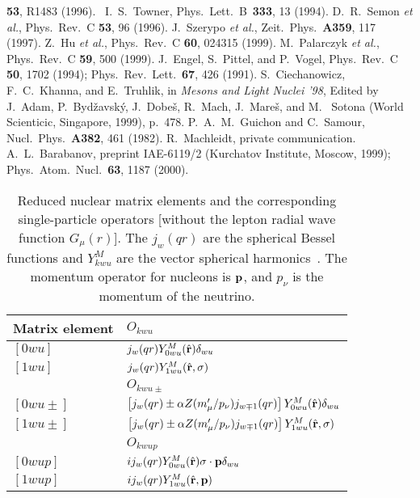 \begin{thebibliography}{00}
  {\bf 53}, R1483 (1996).~
 I.~S.~Towner, Phys.~Lett.~B~{\bf 333}, 13 (1994).
 D.~R.~Semon {\em et al.}, Phys.~Rev.~C {\bf 53}, 96 (1996).
 J.~Szerypo {\em et al.}, Zeit.~Phys.~{\bf A359}, 117 (1997).
 Z.~Hu {\em et al.}, Phys.~Rev.~C {\bf 60}, 024315 (1999).
 M.~Palarczyk {\em et al.}, Phys.~Rev.~C {\bf 59}, 500 (1999).
J.~Engel, S.~Pittel, and P.~Vogel, 
                 Phys.~Rev.~C {\bf 50}, 1702 (1994); Phys.~Rev.~Lett.~{\bf 67}, 426 (1991).
 S.~Ciechanowicz, F.~C.~Khanna, and E.~Truhlik, in
  {\em Mesons and Light Nuclei '98}, Edited by J.~Adam,
  P.~Byd\v{z}avsk\'{y}, J.~Dobe\v{s}, R.~Mach, J.~Mare\v{s}, and M.~
  Sotona (World Scienticic, Singapore, 1999), p.~478.
 P.~A.~M.~Guichon and C.~Samour, Nucl.~Phys.~{\bf A382}, 
  461 (1982).
 R.~Machleidt, private communication.
 A.~L.~Barabanov, preprint IAE-6119/2 (Kurchatov
  Institute, Moscow, 1999); Phys.~Atom.~Nucl.~{\bf 63}, 1187 (2000).


\end{thebibliography}
\clearpage
\begin{table}
\caption{Reduced nuclear matrix elements and the
corresponding single-particle operators [without the lepton radial
wave function $G_\mu(r)$]. The 
$j_w(qr)$ are the spherical Bessel functions and $Y_{kwu}^M$ are the 
vector spherical harmonics~\protect\cite{mor60}. The momentum
operator for nucleons is $\bf p$, and $p_\nu$ is the momentum
of the neutrino.}
\begin{tabular}{ll}
        Matrix element & $O_{kwu}$ \\
        \hline
        \vspace{2pt}
        $[0wu]$ & $j_w(qr)Y_{0wu}^M(\hat {\bf r})\delta_{wu}$ \\
        $[1wu]$ & $j_w(qr)Y_{1wu}^M(\hat {\bf r},{\mathbf\sigma})$ \\
        \hline
        & $O_{kwu\pm}$ \\
        \hline
        $[0wu\pm]$ & $\left[j_w(qr)\pm\alpha Z(m_\mu'/p_\nu
           )j_{w\mp1}(qr)\right]Y_{0wu}^M
          (\hat {\bf r})\delta_{wu}$ \\
        $[1wu\pm]$ & $\left[j_w(qr)\pm\alpha Z(m_\mu'/p_\nu
           )j_{w\mp1}(qr)\right]Y_{1wu}^M
           (\hat {\bf r},{\mathbf\sigma})$ \\
        \hline
        & $O_{kwup}$ \\
        \hline
        $[0wup]$ & $ij_w(qr)Y_{0wu}^M(\hat
           {\bf r}){\mathbf\sigma}\cdot{\bf p}\delta_{wu}$ \\
        $[1wup]$ & $ij_w(qr)Y_{1wu}^M(\hat {\bf r},{\bf p})$ \\
\end{tabular}
\label{table:operators}
\end{table}

